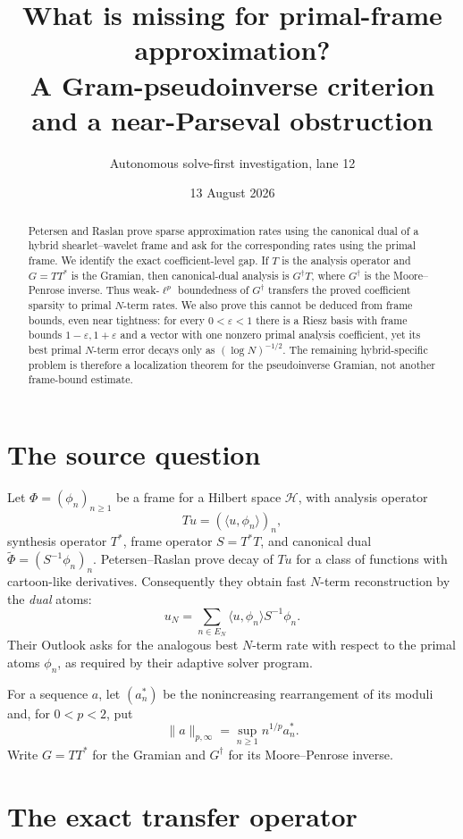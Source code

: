 \documentclass[11pt]{article}
\title{What is missing for primal-frame approximation?\\
\large A Gram-pseudoinverse criterion and a near-Parseval obstruction}
\author{Autonomous solve-first investigation, lane 12}
\date{13 August 2026}
\newcommand{\Hh}{\mathcal H}
\newcommand{\eps}{\varepsilon}
\begin{document}
\maketitle

\begin{abstract}
Petersen and Raslan prove sparse approximation rates using the canonical dual
of a hybrid shearlet--wavelet frame and ask for the corresponding rates using
the primal frame.  We identify the exact coefficient-level gap.  If $T$ is
the analysis operator and $G=TT^*$ is the Gramian, then canonical-dual
analysis is $G^\dagger T$, where $G^\dagger$ is the Moore--Penrose inverse.
Thus weak-$\ell^p$ boundedness of $G^\dagger$ transfers the proved
coefficient sparsity to primal $N$-term rates.  We also prove this cannot be
deduced from frame bounds, even near tightness: for every $0<\eps<1$ there is
a Riesz basis with frame bounds $1-\eps,1+\eps$ and a vector with one nonzero
primal analysis coefficient, yet its best primal $N$-term error decays only
as $(\log N)^{-1/2}$.  The remaining hybrid-specific problem is therefore a
localization theorem for the pseudoinverse Gramian, not another frame-bound
estimate.
\end{abstract}

\section{The source question}

Let $\Phi=(\phi_n)_{n\ge1}$ be a frame for a Hilbert space $\Hh$, with
analysis operator
\[
 Tu=(\langle u,\phi_n\rangle)_n,
\]
synthesis operator $T^*$, frame operator $S=T^*T$, and canonical dual
$\widetilde\Phi=(S^{-1}\phi_n)_n$.  Petersen--Raslan \cite{PR} prove decay
of $Tu$ for a class of functions with cartoon-like derivatives.  Consequently
they obtain fast $N$-term reconstruction by the \emph{dual} atoms:
\[
 u_N=\sum_{n\in E_N}\langle u,\phi_n\rangle S^{-1}\phi_n.
\]
Their Outlook asks for the analogous best $N$-term rate with respect to the
primal atoms $\phi_n$, as required by their adaptive solver program.

For a sequence $a$, let $(a_n^*)$ be the nonincreasing rearrangement of its
moduli and, for $0<p<2$, put
\[
 \|a\|_{p,\infty}=\sup_{n\ge1}n^{1/p}a_n^*.
\]
Write $G=TT^*$ for the Gramian and $G^\dagger$ for its Moore--Penrose inverse.

\section{The exact transfer operator}
\end{document}
